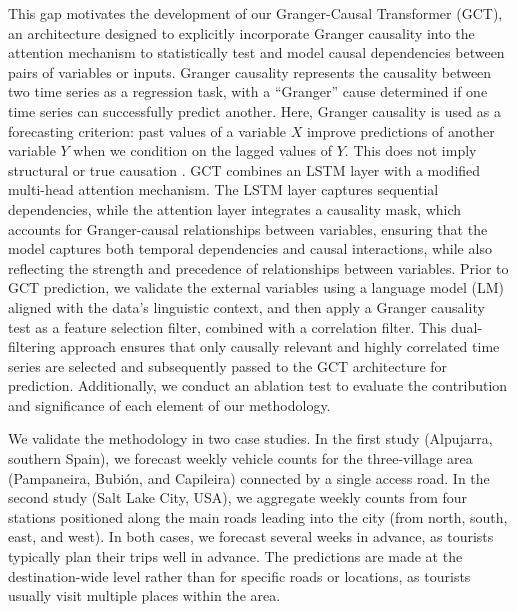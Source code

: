 \documentclass[acmsmall]{acmart}
\begin{document}
This gap motivates the development of our Granger-Causal Transformer (GCT), an architecture designed to explicitly incorporate Granger causality into the attention mechanism to statistically test and model causal dependencies between pairs of variables or inputs. Granger causality represents the causality between two time series as a regression task, with a ``Granger'' cause determined if one time series can successfully predict another. {\color{black}Here, Granger causality is used as a forecasting criterion: past values of a variable $X$ improve predictions of another variable $Y$ when we condition on the lagged values of $Y$. This does not imply structural or true causation \cite{granger1969investigating}.}
GCT combines an LSTM layer with a modified multi-head attention mechanism. The LSTM layer captures sequential dependencies, while the attention layer integrates a causality mask, which accounts for Granger-causal relationships between variables, ensuring that the model captures both temporal dependencies and causal interactions, while also reflecting the strength and precedence of relationships between variables. Prior to GCT prediction, we validate the external variables using {\color{black}a language model (LM) aligned with the data’s linguistic context}, and then apply a Granger causality test as a feature selection filter, combined with a correlation filter. This dual-filtering approach ensures that only causally relevant and highly correlated time series are selected and subsequently passed to the GCT architecture for prediction. Additionally, we conduct an ablation test to evaluate the contribution and significance of each element of our methodology. 




We validate the methodology in {\color{black} two case studies}. In the first study (Alpujarra, southern Spain), we forecast weekly vehicle counts for the three-village area (Pampaneira, Bubión, and Capileira) connected by a single access road. {\color{black} In the second study (Salt Lake City, USA), we aggregate weekly counts from four stations positioned along the main roads leading into the city (from north, south, east, and west). In both cases, we forecast several weeks in advance, as tourists typically plan their trips well in advance. The predictions are made at the destination-wide level rather than for specific roads or locations, as tourists usually visit multiple places within the area.}
\end{document}
